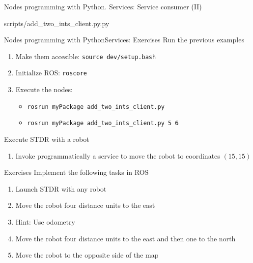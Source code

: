 \documentclass[10pt,compress]{beamer} %
\begin{document}
\begin{frame}[plain]{Nodes programming with Python. Services: Service consumer (II)}
\tiny{
    \vspace{-0.2cm}
	\begin{block}{scripts/add\_two\_ints\_client.py.py}
    \vspace{-0.2cm}
        
    \vspace{-0.2cm}
	\end{block}

	}
\end{frame}

\begin{frame}{Nodes programming with Python}{Services: Exercises}
	Run the previous examples
	\begin{enumerate}
		\item Make them accesible: \texttt{source dev/setup.bash}
		\item Initialize ROS: \texttt{roscore}
		\item Execute the nodes: 
			\begin{itemize}
				\item \texttt{rosrun myPackage add\_two\_ints\_client.py}
				\item \texttt{rosrun myPackage add\_two\_ints\_client.py 5 6}
			\end{itemize}
	\end{enumerate}
	Execute STDR with a robot
	\begin{enumerate}
		\item Invoke programmatically a service to move the robot to coordinates $(15, 15)$
	\end{enumerate}
\end{frame}

\begin{frame}{Exercises}
	Implement the following tasks in ROS
	\begin{enumerate}
		\item Launch STDR with any robot
		\item Move the robot four distance units to the east
		\item[] Hint: Use odometry
		\item Move the robot four distance units to the east and then one to the north
		\item Move the robot to the opposite side of the map
	\end{enumerate}
\end{frame}
\end{document}
